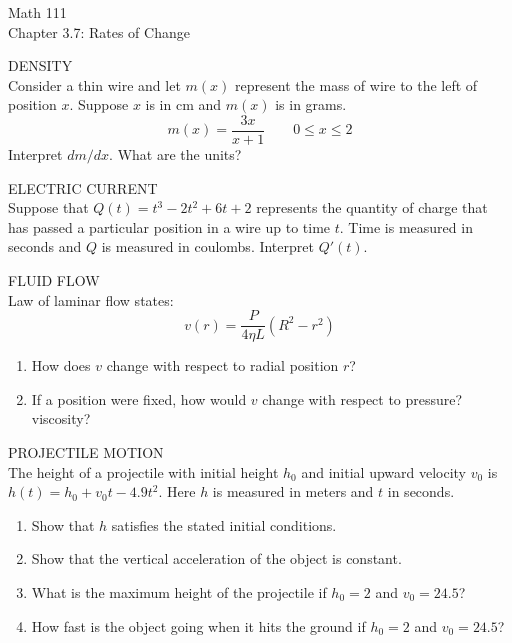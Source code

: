\documentclass[11pt]{article}
\begin{document}
\begin{center}
\Large
\rm{Math 111}
\\
\rm{Chapter 3.7:  Rates of Change}
\\
\end{center}
\vspace{0.2in}

DENSITY\\
Consider a thin wire and let $m(x)$ represent the mass of wire to the left of position $x$.  Suppose $x$ is in cm and $m(x)$ is in grams.
\begin{displaymath}
m(x)=\frac{3x}{x+1} \quad\quad 0\leq x\leq 2
\end{displaymath} 
Interpret $dm/dx$.  What are the units?

\vspace{1.in}


ELECTRIC CURRENT\\
Suppose that $Q(t)= t^3-2t^2+6t+2$ represents the quantity of charge that has passed a particular position in
a wire up to time $t$.  Time is measured in seconds and $Q$ is measured in coulombs.  Interpret $Q'(t)$.

\vspace{1.in}

FLUID FLOW\\
Law of laminar flow states:
\begin{displaymath}
v(r)=\frac{P}{4\eta L}(R^2-r^2)
\end{displaymath}

\begin{enumerate}
	\item{How does $v$ change with respect to radial position $r$?}
	\item{If a position were fixed, how would $v$ change with respect to pressure? viscosity?}
\end{enumerate}

\vspace{1.5in}

\pagebreak
PROJECTILE MOTION\\
The height of a projectile with initial height $h_0$ and initial upward velocity $v_0$ is \\ $h(t)=h_0 + v_0t-4.9t^2$.
Here $h$ is measured in meters and $t$ in seconds.   

\begin{enumerate}
	\item {Show that $h$ satisfies the stated initial conditions.}
	\item{Show that the vertical acceleration of the object is constant.}
	\item{What is the maximum height of the projectile if $h_0=2$ and $v_0=24.5$?}
	\item{How fast is the object going when it hits the ground if $h_0=2$ and $v_0=24.5$?}
\end{enumerate}
\end{document}
